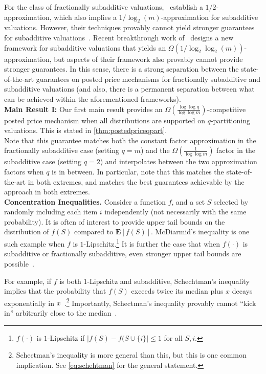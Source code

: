 \documentclass[11pt]{article}\usepackage{amsfonts}
\numberwithin{theorem}{subsection}
\newcommand{\expect}{\mathbf{E}}
\begin{document}
For the class of fractionally subadditive valuations,~\cite{FeldmanGL15} establish a $1/2$-approximation, which also implies a $1/\log_2(m)$-approximation for subadditive valuations. However, their techniques provably cannot yield stronger guarantees for subadditive valuations~\cite{BhawalkarR11,DuttingFKL20}. Recent breakthrough work of~\cite{DuttingKL20} designs a new framework for subadditive valuations that yields an $\Omega(1/\log_2\log_2(m))$-approximation, but aspects of their framework also provably cannot provide stronger guarantees. In this sense, there is a strong separation between the state-of-the-art guarantees on posted price mechanisms for fractionally subadditive and subadditive valuations (and also, there is a permanent separation between what can be achieved within the aforementioned frameworks).\\

\noindent\textbf{Main Result I:} Our first main result provides an $\Omega(\frac{\log \log q}{\log \log m})$-competitive posted price mechanism when all distributions are supported on $q$-partitioning valuations. This is stated in \cref{thm:postedpriceqpart}.\\

\noindent Note that this guarantee matches both the constant factor approximation in the fractionally subadditive case (setting $q = m$) and the $\Omega(\frac{1}{\log \log m})$ factor in the subadditive case (setting $q = 2$) and interpolates between the two approximation factors when $q$ is in between. In particular, note that this matches the state-of-the-art in both extremes, and matches the best guarantees achievable by the~\cite{DuttingKL20} approach in both extremes.\\

\noindent\textbf{Concentration Inequalities.} Consider a function $f$, and a set $S$ selected by randomly including each item $i$ independently (not necessarily with the same probability). It is often of interest to provide upper tail bounds on the distribution of $f(S)$ compared to $\expect[f(S)]$. McDiarmid's inequality is one such example when $f$ is $1$-Lipschitz.\footnote{$f(\cdot)$ is $1$-Lipschitz if $|f(S) - f(S \cup \{i\}| \leq 1$ for all $S,i$.} It is further the case that when $f(\cdot)$ is subadditive or fractionally subadditive, even stronger upper tail bounds are possible~\cite{Vondrak10}.



For example, if $f$ is both $1$-Lipschitz and subadditive, Schechtman's inequality implies that the probability that $f(S)$ exceeds twice its median plus $x$ decays exponentially in $x$~\cite{schectman}.\footnote{Schectman's inequality is more general than this, but this is one common implication. See \cref{eq:schehtman} for the general statement.} Importantly, Schectman's inequality provably cannot ``kick in'' arbitrarily close to the median~\cite{Vondrak10}.\\
\end{document}
